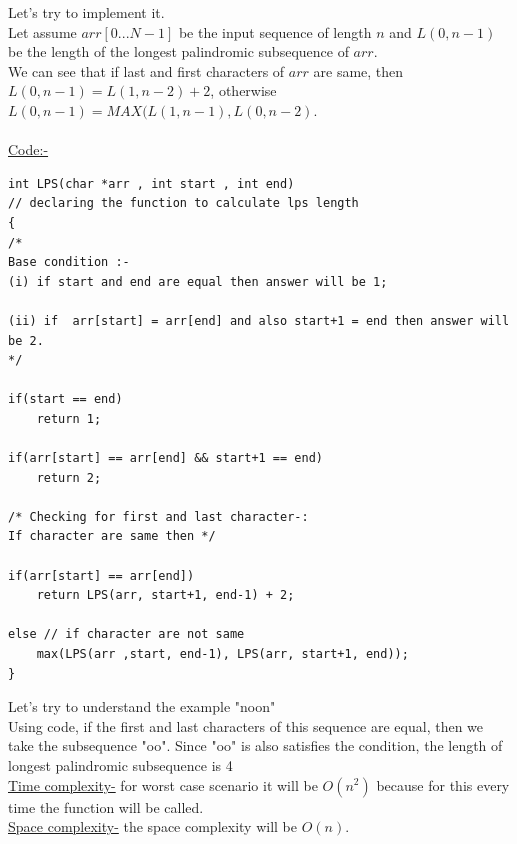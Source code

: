 \documentclass[12pt]{book}
\begin{document}
Let’s try to implement it.\\
Let assume $arr[0 ... N-1]$ be the input sequence of length $n$ and $L(0, n-1)$ be the length of the longest palindromic subsequence of $arr$.\\
We can see that if last and first characters of $arr$ are same, then \\$L(0, n-1) = L(1, n-2)+2$, otherwise $L(0, n-1) = MAX(L(1, n-1), L(0, n-2)$.\\ \\
\underline{Code:-}
\begin{lstlisting}
int LPS(char *arr , int start , int end)
// declaring the function to calculate lps length
{
/*
Base condition :-
(i) if start and end are equal then answer will be 1;

(ii) if  arr[start] = arr[end] and also start+1 = end then answer will be 2.
*/

if(start == end)
    return 1;

if(arr[start] == arr[end] && start+1 == end)
    return 2;

/* Checking for first and last character-:
If character are same then */

if(arr[start] == arr[end])
    return LPS(arr, start+1, end-1) + 2;

else // if character are not same 
    max(LPS(arr ,start, end-1), LPS(arr, start+1, end));
}
\end{lstlisting}
Let’s try to understand the example "noon"\\

Using code, if the first and last characters of this sequence are equal, then we take the subsequence "oo". Since "oo" is also satisfies the condition, the length of longest palindromic subsequence is 4\\

\underline{Time complexity-} for worst case scenario it will be $O (n^2)$ because for this every time the function will be called.\\

\underline{Space complexity-} the space complexity will be $O(n)$.\\
\end{document}
